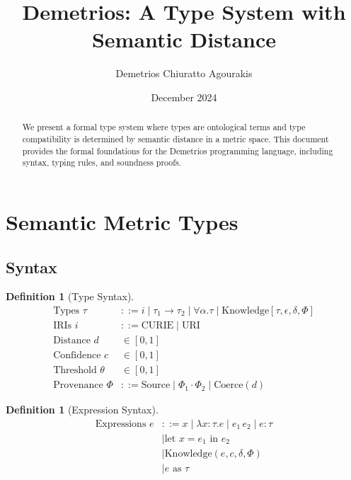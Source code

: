 \documentclass{article}
\title{Demetrios: A Type System with Semantic Distance}
\author{Demetrios Chiuratto Agourakis}
\date{December 2024}
\newtheorem{definition}[theorem]{Definition}
\begin{document}
\maketitle

\begin{abstract}
We present a formal type system where types are ontological terms and type
compatibility is determined by semantic distance in a metric space. This
document provides the formal foundations for the Demetrios programming
language, including syntax, typing rules, and soundness proofs.
\end{abstract}

\section{Semantic Metric Types}

\subsection{Syntax}

\begin{definition}[Type Syntax]
\begin{align*}
\text{Types } \tau &::= i \mid \tau_1 \to \tau_2 \mid \forall \alpha. \tau \mid \text{Knowledge}[\tau, \epsilon, \delta, \Phi] \\
\text{IRIs } i &::= \text{CURIE} \mid \text{URI} \\
\text{Distance } d &\in [0, 1] \\
\text{Confidence } c &\in [0, 1] \\
\text{Threshold } \theta &\in [0, 1] \\
\text{Provenance } \Phi &::= \text{Source} \mid \Phi_1 \cdot \Phi_2 \mid \text{Coerce}(d)
\end{align*}
\end{definition}

\begin{definition}[Expression Syntax]
\begin{align*}
\text{Expressions } e &::= x \mid \lambda x:\tau. e \mid e_1 \, e_2 \mid e : \tau \\
                      &\mid \text{let } x = e_1 \text{ in } e_2 \\
                      &\mid \text{Knowledge}(e, c, \delta, \Phi) \\
                      &\mid e \text{ as } \tau
\end{align*}
\end{definition}
\end{document}
